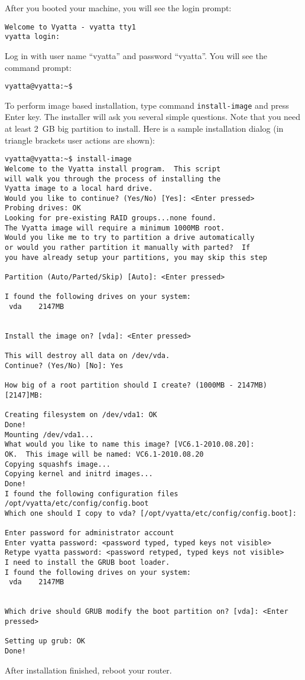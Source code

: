 After you booted your machine, you will see the login prompt:
\begin{verbatim}
Welcome to Vyatta - vyatta tty1
vyatta login: 
\end{verbatim}

Log in with user name ``vyatta'' and password ``vyatta''. You will see the command prompt:
\begin{verbatim}
vyatta@vyatta:~$
\end{verbatim}

To perform image based installation, type command \texttt{install-image} and press Enter key. The installer will ask
you several simple questions. Note that you need at least 2~GB big partition to install.
Here is a sample installation dialog (in triangle brackets user actions are shown):
\begin{verbatim}
vyatta@vyatta:~$ install-image 
Welcome to the Vyatta install program.  This script
will walk you through the process of installing the
Vyatta image to a local hard drive.
Would you like to continue? (Yes/No) [Yes]: <Enter pressed>
Probing drives: OK
Looking for pre-existing RAID groups...none found.
The Vyatta image will require a minimum 1000MB root.
Would you like me to try to partition a drive automatically
or would you rather partition it manually with parted?  If
you have already setup your partitions, you may skip this step

Partition (Auto/Parted/Skip) [Auto]: <Enter pressed>

I found the following drives on your system:
 vda	2147MB


Install the image on? [vda]: <Enter pressed>

This will destroy all data on /dev/vda.
Continue? (Yes/No) [No]: Yes

How big of a root partition should I create? (1000MB - 2147MB) [2147]MB: 

Creating filesystem on /dev/vda1: OK
Done!
Mounting /dev/vda1...
What would you like to name this image? [VC6.1-2010.08.20]: 
OK.  This image will be named: VC6.1-2010.08.20
Copying squashfs image...
Copying kernel and initrd images...
Done!
I found the following configuration files
/opt/vyatta/etc/config/config.boot
Which one should I copy to vda? [/opt/vyatta/etc/config/config.boot]: 

Enter password for administrator account
Enter vyatta password: <password typed, typed keys not visible>
Retype vyatta password: <password retyped, typed keys not visible>
I need to install the GRUB boot loader.
I found the following drives on your system:
 vda	2147MB


Which drive should GRUB modify the boot partition on? [vda]: <Enter pressed>

Setting up grub: OK
Done!
\end{verbatim}
After installation finished, reboot your router.
\pagebreak

